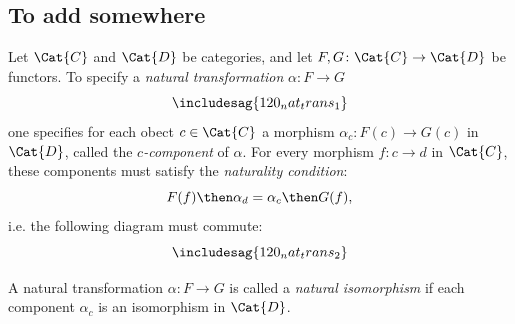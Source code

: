 \subsection{To add somewhere}


\begin{shaded}
\begin{definition}
Let $\Cat{C}$ and $\Cat{D}$ be categories, and let $F,G\colon \Cat{C}\to \Cat{D}$ be functors. To specify a \emph{natural transformation} $\alpha\colon F\to G$
\begin{equation}
\includesag{120_nat_trans_1}
\end{equation}
one specifies for each obect $c\in \Cat{C}$ a morphism $\alpha_c\colon F(c)\to G(c)$ in $\Cat{D}$, called the $c$\emph{-component} of $\alpha$. For every morphism $f\colon c\to d$ in $\Cat{C}$, these components must satisfy the \emph{naturality condition}:
\begin{equation}
    F(f)\then \alpha_d = \alpha_c\then G(f),
\end{equation}
i.e. the following diagram must commute:
\begin{equation}
\includesag{120_nat_trans_2}
\end{equation}
\end{definition}

\begin{remark}
A natural transformation $\alpha\colon F\to G$ is called a \emph{natural isomorphism} if each component $\alpha_c$ is an isomorphism in $\Cat{D}$.
\end{remark}


\end{shaded}
